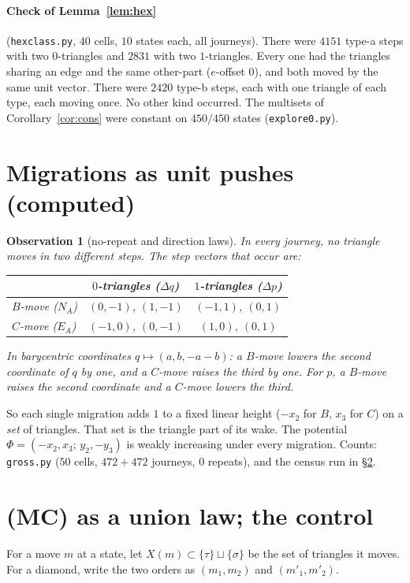 \documentclass[11pt]{article}
\newtheorem{observation}[theorem]{Observation}
\theoremstyle{definition}
\begin{document}
\paragraph{Check of Lemma~\ref{lem:hex}} (\texttt{hexclass.py}, $40$ cells, $10$ states each, all journeys). There were $4151$ type-a steps with two
$0$-triangles and $2831$ with two $1$-triangles. Every one had the triangles sharing an edge and the same other-part ($e$-offset $0$), and
both moved by the same unit vector. There were $2420$ type-b steps, each with one triangle of each type, each moving once. No other kind
occurred. The multisets of Corollary~\ref{cor:cons} were constant on $450/450$ states (\texttt{explore0.py}).

\section{Migrations as unit pushes (computed)}\label{sec:push}
\begin{observation}[no-repeat and direction laws]
In every journey, no triangle moves in two different steps. The step vectors that occur are:
\begin{center}\begin{tabular}{lcc}\toprule
& $0$-triangles ($\Delta q$) & $1$-triangles ($\Delta p$)\\\midrule
$B$-move ($N_A$) & $(0,-1)$, $(1,-1)$ & $(-1,1)$, $(0,1)$\\
$C$-move ($E_A$) & $(-1,0)$, $(0,-1)$ & $(1,0)$, $(0,1)$\\\bottomrule
\end{tabular}\end{center}
In barycentric coordinates $q\mapsto(a,b,-a-b)$: a $B$-move lowers the second coordinate of $q$ by one, and a $C$-move raises the third by
one. For $p$, a $B$-move raises the second coordinate and a $C$-move lowers the third.
\end{observation}
So each single migration adds $1$ to a fixed linear height ($-x_2$ for $B$, $x_3$ for $C$) on a \emph{set} of triangles. That set is the
triangle part of its wake. The potential $\Phi=(-x_2,x_3;\,y_2,-y_3)$ is weakly increasing under every migration.
Counts: \texttt{gross.py} ($50$ cells, $472+472$ journeys, $0$ repeats), and the census run in \S\ref{sec:census}.

\section{(MC) as a union law; the control}\label{sec:census}
For a move $m$ at a state, let $X(m)\subset\{\tau\}\sqcup\{\sigma\}$ be the set of triangles it moves. For a diamond, write the two orders as
$(m_1,m_2)$ and $(m'_1,m'_2)$.
\end{document}
